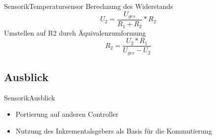 \begin{frame}{Sensorik}{Temperatursensor}	
Berechnung des Widerstands
\begin{equation}
U_{2} = \frac{U_{ges}}{R_{1} + R_{2}} * R_{2}
\end{equation}
Umstellen auf R2 durch Äquivalenzumformung
\begin{equation}
R_{2} = \frac{U_{2} * R_{1}}{U_{ges} - U_{2}}
\end{equation} 
\end{frame}

\subsection{Ausblick}
\begin{frame}{Sensorik}{Ausblick}	
 \begin{itemize}
 \item Portierung auf anderen Controller
 \item Nutzung des Inkrementalsgebers als Basis für die Kommutierung
 \end{itemize}
\end{frame}